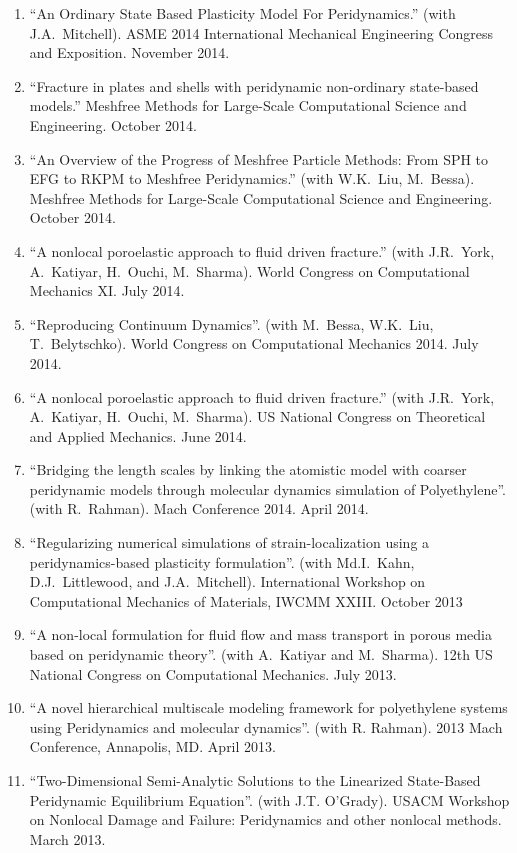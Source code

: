 \begin{etaremune}
\begin{enumerate}
    \item ``An Ordinary State Based Plasticity Model For Peridynamics.'' (with J.A.~Mitchell). ASME 2014 International Mechanical Engineering Congress and Exposition. November 2014.
    \item ``Fracture in plates and shells with peridynamic non-ordinary state-based models.''  Meshfree Methods for Large-Scale Computational Science and Engineering. October 2014.
    \item ``An Overview of the Progress of Meshfree Particle Methods: From SPH to EFG to RKPM to Meshfree Peridynamics.'' (with W.K.~Liu, M.~Bessa). Meshfree Methods for Large-Scale Computational Science and Engineering. October 2014.
    \item ``A nonlocal poroelastic approach to fluid driven fracture.'' (with J.R.~York, A.~Katiyar, H.~Ouchi, M.~Sharma). World Congress on Computational Mechanics XI.  July 2014.
    \item ``Reproducing Continuum Dynamics''. (with M.~Bessa, W.K.~Liu, T.~Belytschko). World Congress on Computational Mechanics 2014.  July 2014.
    \item ``A nonlocal poroelastic approach to fluid driven fracture.'' (with J.R.~York, A.~Katiyar, H.~Ouchi, M.~Sharma). US National Congress on Theoretical and Applied Mechanics.  June 2014.
    \item ``Bridging the length scales by linking the atomistic model with coarser peridynamic models through molecular dynamics simulation of Polyethylene''. (with R.~Rahman). Mach Conference 2014.  April 2014.
    \item ``Regularizing numerical simulations of strain-localization using a peridynamics-based plasticity formulation''. (with Md.I.~Kahn, D.J.~Littlewood, and J.A.~Mitchell). International Workshop on Computational Mechanics of Materials, IWCMM XXIII. October 2013
    \item ``A non-local formulation for fluid flow and mass transport in porous media based on peridynamic theory''. (with A.~Katiyar and M.~Sharma). 12th US National Congress on Computational Mechanics. July 2013.
    \item ``A novel hierarchical multiscale modeling framework for polyethylene systems using Peridynamics and molecular dynamics''. (with R. Rahman). 2013 Mach Conference, Annapolis, MD. April 2013. 
    \item ``Two-Dimensional Semi-Analytic Solutions to the Linearized State-Based Peridynamic Equilibrium Equation''. (with J.T. O'Grady). USACM Workshop on Nonlocal Damage and Failure: Peridynamics and other nonlocal methods. March 2013.

\end{enumerate}
\end{etaremune}
